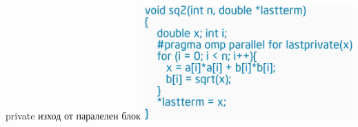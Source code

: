 \documentclass{beamer}
\begin{document}
\begin{frame}{private изход от паралелен блок}
\includegraphics[width=0.6\textwidth]{private-init3.png}
\end{frame}
\end{document}
